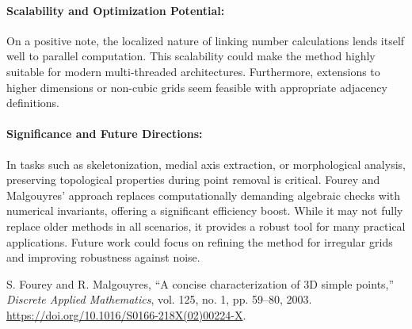 \documentclass{llncs}
\begin{document}
\paragraph{Scalability and Optimization Potential:}
On a positive note, the localized nature of linking number calculations lends itself well to parallel computation. This scalability could make the method highly suitable for modern multi-threaded architectures. Furthermore, extensions to higher dimensions or non-cubic grids seem feasible with appropriate adjacency definitions.

\paragraph{Significance and Future Directions:}
In tasks such as skeletonization, medial axis extraction, or morphological analysis, preserving topological properties during point removal is critical. Fourey and Malgouyres' approach replaces computationally demanding algebraic checks with numerical invariants, offering a significant efficiency boost. While it may not fully replace older methods in all scenarios, it provides a robust tool for many practical applications. Future work could focus on refining the method for irregular grids and improving robustness against noise.

\begin{thebibliography}{1}

S. Fourey and R. Malgouyres,
``A concise characterization of 3D simple points,''
\textit{Discrete Applied Mathematics},
vol. 125, no. 1, pp. 59--80, 2003.
\url{https://doi.org/10.1016/S0166-218X(02)00224-X}.

\end{thebibliography}
\end{document}

